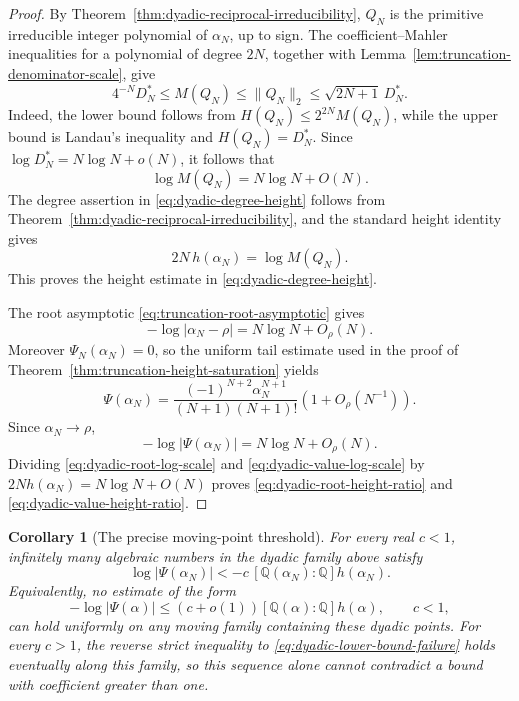 \documentclass[11pt]{article}
\newtheorem{corollary}[theorem]{Corollary}
\theoremstyle{definition}
\theoremstyle{remark}
\newcommand{\Q}{\mathbb Q}
\begin{document}
\begin{proof}
By Theorem~\ref{thm:dyadic-reciprocal-irreducibility}, \(Q_N\) is the
primitive irreducible integer polynomial of \(\alpha_N\), up to sign.
The coefficient--Mahler inequalities for a polynomial of degree \(2N\),
together with Lemma~\ref{lem:truncation-denominator-scale}, give
\begin{equation}\label{eq:dyadic-mahler-bounds}
 4^{-N}D_N^*
 \leq M(Q_N)
 \leq \lVert Q_N\rVert_2
 \leq \sqrt{2N+1}\,D_N^*.
\end{equation}
Indeed, the lower bound follows from
\(H(Q_N)\leq2^{2N}M(Q_N)\), while the upper bound is Landau's inequality
and \(H(Q_N)=D_N^*\).  Since
\(\log D_N^*=N\log N+o(N)\), it follows that
\begin{equation}\label{eq:dyadic-mahler-asymptotic}
 \log M(Q_N)=N\log N+O(N).
\end{equation}
The degree assertion in \eqref{eq:dyadic-degree-height} follows from
Theorem~\ref{thm:dyadic-reciprocal-irreducibility}, and the standard height
identity gives
\[
 2N\,h(\alpha_N)=\log M(Q_N).
\]
This proves the height estimate in \eqref{eq:dyadic-degree-height}.

The root asymptotic \eqref{eq:truncation-root-asymptotic} gives
\begin{equation}\label{eq:dyadic-root-log-scale}
 -\log|\alpha_N-\rho|=N\log N+O_\rho(N).
\end{equation}
Moreover \(\Psi_N(\alpha_N)=0\), so the uniform tail estimate used in
the proof of Theorem~\ref{thm:truncation-height-saturation} yields
\[
 \Psi(\alpha_N)
 =\frac{(-1)^{N+2}\alpha_N^{N+1}}
 {(N+1)(N+1)!}
 \left(1+O_\rho(N^{-1})\right).
\]
Since \(\alpha_N\to\rho\),
\begin{equation}\label{eq:dyadic-value-log-scale}
 -\log|\Psi(\alpha_N)|=N\log N+O_\rho(N).
\end{equation}
Dividing \eqref{eq:dyadic-root-log-scale} and
\eqref{eq:dyadic-value-log-scale} by
\(2N h(\alpha_N)=N\log N+O(N)\) proves
\eqref{eq:dyadic-root-height-ratio} and
\eqref{eq:dyadic-value-height-ratio}.
\end{proof}

\begin{corollary}[The precise moving-point threshold]
\label{cor:dyadic-moving-point-threshold}
For every real \(c<1\), infinitely many algebraic numbers in the dyadic
family above satisfy
\begin{equation}\label{eq:dyadic-lower-bound-failure}
 \log|\Psi(\alpha_N)|
 <-c\,[\Q(\alpha_N):\Q]h(\alpha_N).
\end{equation}
Equivalently, no estimate of the form
\[
 -\log|\Psi(\alpha)|
 \leq(c+o(1))[\Q(\alpha):\Q]h(\alpha),
 \qquad c<1,
\]
can hold uniformly on any moving family containing these dyadic points.
For every \(c>1\), the reverse strict inequality to
\eqref{eq:dyadic-lower-bound-failure} holds eventually along this family,
so this sequence alone cannot contradict a bound with coefficient greater
than one.
\end{corollary}
\end{document}
